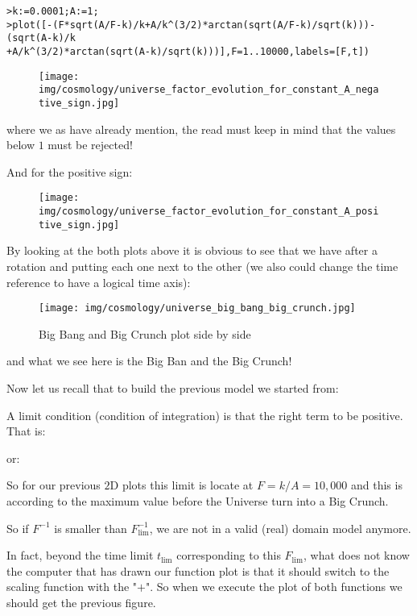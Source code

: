 	\texttt{>k:=0.0001;A:=1;\\
	 >plot([-(F*sqrt(A/F-k)/k+A/k\string^(3/2)*arctan(sqrt(A/F-k)/sqrt(k)))-(sqrt(A-k)/k\\
	+A/k\string^(3/2)*arctan(sqrt(A-k)/sqrt(k)))],F=1..10000,labels=[F,t])}
	\begin{figure}[H]
		\begin{center}
		\texttt{[image: img/cosmology/universe\_factor\_evolution\_for\_constant\_A\_negative\_sign.jpg]}
		\end{center}
	\end{figure}
	where we as have already mention, the read must keep in mind that the values below $1$ must be rejected!
	
	And for the positive sign:
	\begin{figure}[H]
		\begin{center}
		\texttt{[image: img/cosmology/universe\_factor\_evolution\_for\_constant\_A\_positive\_sign.jpg]}
		\end{center}
	\end{figure}
	By looking at the both plots above it is obvious to see that we have after a rotation and putting each one next to the other (we also could change the time reference to have a logical time axis):
	\begin{figure}[H]
		\centering
		\texttt{[image: img/cosmology/universe\_big\_bang\_big\_crunch.jpg]}
		\caption{Big Bang and Big Crunch plot side by side}
	\end{figure}
	and what we see here is the Big Ban and the Big Crunch!
	
	Now let us recall that to build the previous model we started from:
	
	A limit condition (condition of integration) is that the right term to be positive. That is:
	
	or:
	
	So for our previous $2$D plots this limit is locate at $F=k/A=10,000$ and this is according to the maximum value before the Universe turn into a Big Crunch.
	
	So if $F^{-1}$ is smaller than $F_{\lim}^{-1}$, we are not in a valid (real) domain model anymore.
	
	In fact, beyond the time limit $t_{\lim}$ corresponding to this $F_{\lim}$, what does not know the computer that has drawn our function plot is that it should switch to the scaling function with the "$+$". So when we execute the plot of both functions we should get the previous figure.
	
